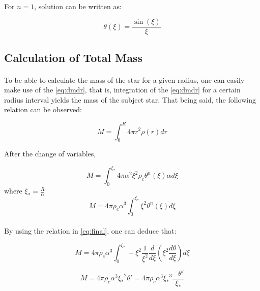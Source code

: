 \documentclass[letterpaper,12pt]{article}
\begin{document}
\paragraph{} For $n = 1$, solution can be written as:

\begin{equation*}
    \theta(\xi) =  \frac{\sin (\xi )}{\xi }
\end{equation*}

\subsection{Calculation of Total Mass}

\paragraph{} To be able to calculate the mass of the star for a given radius, one can easily make use of the \eqref{eq:dmdr}, that is, integration of the \eqref{eq:dmdr} for a certain radius interval yields the mass of the subject star. That being said, the following relation can be observed:

\begin{equation*}
   M =  \int_0^R {4\pi r^2 \rho(r)}dr
\end{equation*}

After the change of variables,

\begin{equation*}
    M = \int_0^{\xi_*} {4 \pi \alpha^2 \xi^2 \rho_c \theta^n (\xi)} \alpha d\xi
\end{equation*}
where ${\xi_*} = \frac{R}{\alpha}$
\begin{equation*}
    M =4 \pi \rho_c \alpha^3 \int_0^{\xi_*} {\xi^2 \theta^n (\xi)} d\xi
\end{equation*}

\paragraph{} By using the relation in \eqref{eq:final}, one can deduce that:

\begin{equation*}
    M =4 \pi \rho_c \alpha^3 \int_0^{\xi_*} -{\xi^2 \frac{1}{\xi^2}\frac{d}{d\xi}\left(\xi^2\frac{d\theta}{d\xi}\right) } d\xi
\end{equation*}

\begin{equation*}
    M = 4 \pi \rho_c \alpha^3 {\xi_*}^2 \theta' = 4 \pi \rho_c \alpha^3 {\xi_*}^3 \frac{-\theta'}{{\xi_*}}
\end{equation*}
\end{document}
